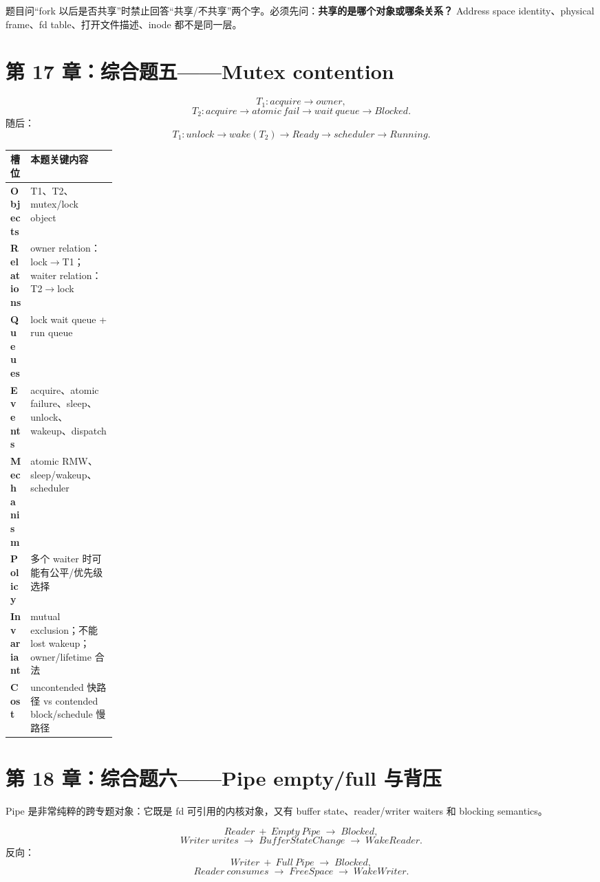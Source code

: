 \documentclass[11pt,a4paper]{ctexart}
\newcommand{\kw}[1]{\textbf{#1}}
\newcommand{\arr}{\;\longrightarrow\;}
\begin{document}
\begin{exam}[跨专题识别点]
题目问“fork 以后是否共享”时禁止回答“共享/不共享”两个字。必须先问：\kw{共享的是哪个对象或哪条关系？} Address space identity、physical frame、fd table、打开文件描述、inode 都不是同一层。
\end{exam}

\section{第 17 章：综合题五——Mutex contention}

\[
T_1:acquire\rightarrow owner,
\]
\[
T_2:acquire\rightarrow atomic\ fail\rightarrow wait\ queue\rightarrow Blocked.
\]
随后：
\[
T_1:unlock\rightarrow wake(T_2)\rightarrow Ready\rightarrow scheduler\rightarrow Running.
\]

\begin{center}
\small
\renewcommand{\arraystretch}{1.25}
\begin{tabularx}{\linewidth}{>{\bfseries}p{0.18\linewidth} X}
\toprule
槽位 & 本题关键内容 \\
\midrule
Objects & T1、T2、mutex/lock object \\
Relations & owner relation：lock$\to$T1；waiter relation：T2$\to$lock \\
Queues & lock wait queue + run queue \\
Events & acquire、atomic failure、sleep、unlock、wakeup、dispatch \\
Mechanism & atomic RMW、sleep/wakeup、scheduler \\
Policy & 多个 waiter 时可能有公平/优先级选择 \\
Invariant & mutual exclusion；不能 lost wakeup；owner/lifetime 合法 \\
Cost & uncontended 快路径 vs contended block/schedule 慢路径 \\
\bottomrule
\end{tabularx}
\end{center}

\section{第 18 章：综合题六——Pipe empty/full 与背压}

Pipe 是非常纯粹的跨专题对象：它既是 fd 可引用的内核对象，又有 buffer state、reader/writer waiters 和 blocking semantics。

\[
Reader\ +\ Empty\ Pipe\arr Blocked,
\]
\[
Writer\ writes\arr BufferStateChange\arr WakeReader.
\]
反向：
\[
Writer\ +\ Full\ Pipe\arr Blocked,
\]
\[
Reader\ consumes\arr FreeSpace\arr WakeWriter.
\]
\end{document}

